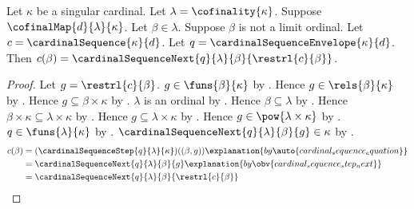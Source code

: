 \begin{proposition}\label{cardinal_sequence_at_nonlimit}
    Let $\kappa$ be a singular cardinal.
    Let $\lambda=\cofinality{\kappa}$.
    Suppose $\cofinalMap{d}{\lambda}{\kappa}$.
    Let $\beta\in\lambda$.
    Suppose $\beta$ is not a limit ordinal.
    Let $c=\cardinalSequence{\kappa}{d}$.
    Let $q=\cardinalSequenceEnvelope{\kappa}{d}$.
    Then $c(\beta)=
        \cardinalSequenceNext{q}{\lambda}{\beta}{\restrl{c}{\beta}}$.
\end{proposition}
\begin{proof}
    Let $g=\restrl{c}{\beta}$.
    $g\in\funs{\beta}{\kappa}$
        by .
    Hence $g\in\rels{\beta}{\kappa}$
        by .
    Hence $g\subseteq\beta\times\kappa$ by .
    $\lambda$ is an ordinal
        by .
    Hence $\beta\subseteq\lambda$
        by .
    Hence $\beta\times\kappa\subseteq\lambda\times\kappa$
        by .
    Hence $g\subseteq\lambda\times\kappa$
        by .
    Hence $g\in\pow{\lambda\times\kappa}$ by .
    $q\in\funs{\lambda}{\kappa}$
        by .
    $\cardinalSequenceNext{q}{\lambda}{\beta}{g}\in\kappa$
        by .
    \begin{align*}
        c(\beta)
            &= (\cardinalSequenceStep{q}{\lambda}{\kappa})((\beta,g))
                \explanation{by \auto{cardinal_sequence_equation}}
            \\
            &= \cardinalSequenceNext{q}{\lambda}{\beta}{g}
                \explanation{by \obv{cardinal_sequence_step_next}}
            \\
            &= \cardinalSequenceNext{q}{\lambda}{\beta}{\restrl{c}{\beta}}
    \end{align*}
\end{proof}

